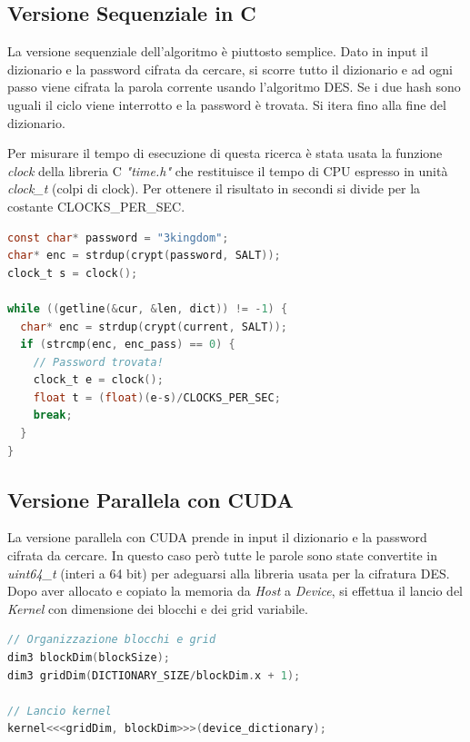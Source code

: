 \documentclass[10pt,twocolumn,letterpaper]{article}
\begin{document}
\subsection{Versione Sequenziale in C}
La versione sequenziale dell'algoritmo è piuttosto semplice. Dato in input il dizionario e la password cifrata da cercare, si scorre tutto il dizionario e ad ogni passo viene cifrata la parola corrente usando l'algoritmo DES. Se i due hash sono uguali il ciclo viene interrotto e la password è trovata. Si itera fino alla fine del dizionario.\newline

Per misurare il tempo di esecuzione di questa ricerca è stata usata la funzione \textit{clock} della libreria C \textit{"time.h"} che restituisce il tempo di CPU espresso in unità \textit{clock\_t} (colpi di clock). Per ottenere il risultato in secondi si divide per la costante CLOCKS\_PER\_SEC.
\newline

\begin{lstlisting}[basicstyle=\small, language=C, frame=single, caption={Esempio di ricerca sequenziale nel dizionario}, captionpos=b]
const char* password = "3kingdom";
char* enc = strdup(crypt(password, SALT));
clock_t s = clock();

while ((getline(&cur, &len, dict)) != -1) {
  char* enc = strdup(crypt(current, SALT));
  if (strcmp(enc, enc_pass) == 0) {
    // Password trovata!
    clock_t e = clock();
    float t = (float)(e-s)/CLOCKS_PER_SEC;
    break;
  }
}
\end{lstlisting}

\subsection{Versione Parallela con CUDA}
La versione parallela con CUDA prende in input il dizionario e la password cifrata da cercare. In questo caso però tutte le parole sono state convertite in \textit{uint64\_t} (interi a 64 bit) per adeguarsi alla libreria usata per la cifratura DES. \cite{DES-CUDA} Dopo aver allocato e copiato la memoria da \textit{Host} a \textit{Device}, si effettua il lancio del \textit{Kernel} con dimensione dei blocchi e dei grid variabile.
\begin{lstlisting}[basicstyle=\scriptsize, language=C, frame=single, caption={Esempio di lancio del kernel in CUDA},captionpos=b]
// Organizzazione blocchi e grid
dim3 blockDim(blockSize);
dim3 gridDim(DICTIONARY_SIZE/blockDim.x + 1);

// Lancio kernel
kernel<<<gridDim, blockDim>>>(device_dictionary);
\end{lstlisting}
\end{document}
